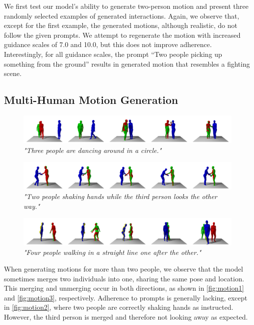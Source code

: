 We first test our model's ability to generate two-person motion and present three randomly selected examples of generated interactions. Again, we observe that, except for the first example, the generated motions, although realistic, do not follow the given prompts. We attempt to regenerate the motion with increased guidance scales of 7.0 and 10.0, but this does not improve adherence. Interestingly, for all guidance scales, the prompt “Two people picking up something from the ground” results in generated motion that resembles a fighting scene. 


\subsection*{Multi-Human Motion Generation}

\begin{figure}[H]
    \centering
    \includegraphics[width=\linewidth]{figures/results/multi.png}
    \caption{\textit{"Three people are dancing around in a circle."}}
    \label{fig:multi1}
\end{figure}

\begin{figure}[H]
    \centering
    \includegraphics[width=\linewidth]{figures/results/multi2.png}
    \caption{\textit{"Two people shaking hands while the third person looks the other way."}}
    \label{fig:multi2}
\end{figure}

\begin{figure}[H]
    \centering
    \includegraphics[width=\linewidth]{figures/results/multi3.png}
    \caption{\textit{"Four people walking in a straight line one after the other."}}
    \label{fig:multi3}
\end{figure}

When generating motions for more than two people, we observe that the model sometimes merges two individuals into one, sharing the same pose and location. This merging and unmerging occur in both directions, as shown in \cref{fig:motion1} and \cref{fig:motion3}, respectively. Adherence to prompts is generally lacking, except in \cref{fig:motion2}, where two people are correctly shaking hands as instructed. However, the third person is merged and therefore not looking away as expected.

